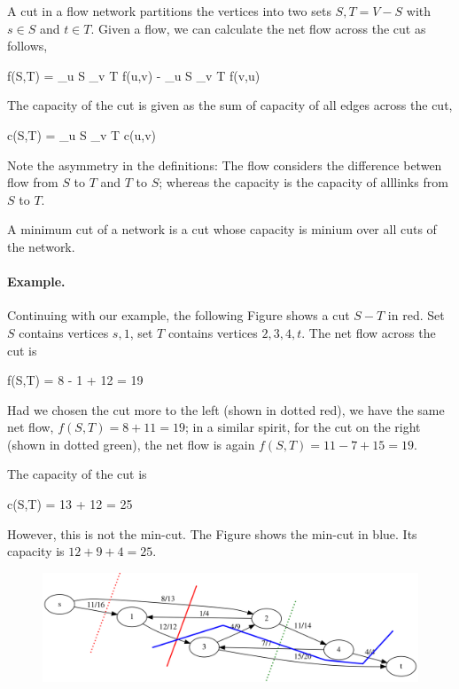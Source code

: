 A cut in a flow network partitions the vertices into two sets $S, T = V - S$ with $s \in S$ and $t \in T$. Given a flow, we can calculate the net flow across the cut as follows,

\bee
f(S,T) = \sum_{u \in S} \sum_{v \in T} f(u,v) - \sum_{u \in S} \sum_{v \in T} f(v,u)
\eee

The capacity of the cut is given as the sum of capacity of all edges across the cut,

\bee
c(S,T) = \sum_{u \in S} \sum_{v \in T} c(u,v)
\eee

Note the asymmetry in the definitions: The flow considers the difference betwen flow from $S$ to $T$ and $T$ to $S$; whereas the capacity is the capacity of alllinks from $S$ to $T$.

A minimum cut of a network is a cut whose capacity is minium over all cuts of the network.

\paragraph{Example.} Continuing with our example, the following Figure shows a cut $S-T$ in red. Set $S$ contains vertices $s,1$, set $T$ contains vertices $2,3,4,t$. The net flow across the cut is

\bee
f(S,T) = 8 - 1 + 12 = 19 
\eee

Had we chosen the cut more to the left (shown in dotted red), we have the same net flow, $f(S,T) = 8 + 11 = 19$; in a similar spirit, for the cut on the right (shown in dotted green), the net flow is again $f(S,T) = 11 - 7 + 15 = 19$.

The capacity of the cut is

\bee
c(S,T) = 13 + 12 = 25
\eee

However, this is not the min-cut. The Figure shows the min-cut in blue. Its capacity is $12 + 9 + 4 = 25$.


\begin{figure}[H] \centering
\includegraphics[scale=0.6]{images/max_flow_03.png}
\end{figure}


